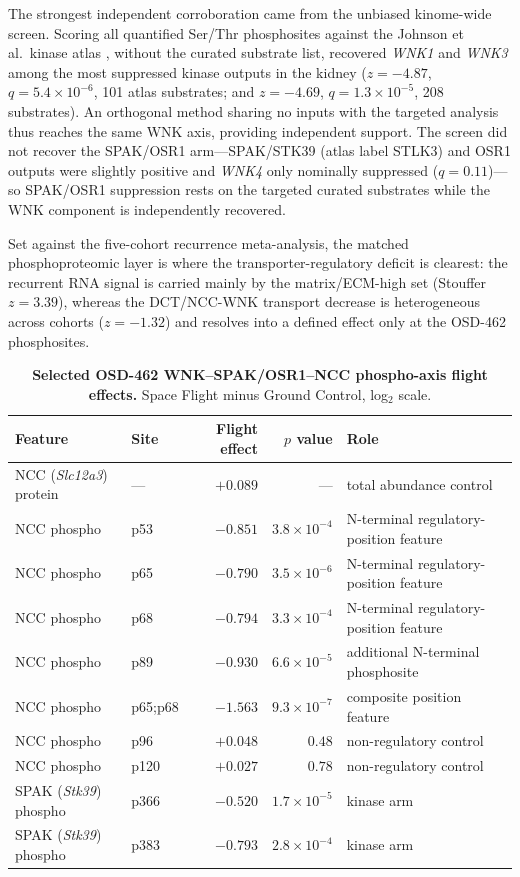 \documentclass[11pt]{article}
\newcommand{\gene}[1]{\textit{#1}}
\begin{document}
The strongest independent corroboration came from the unbiased kinome-wide screen. Scoring all quantified Ser/Thr phosphosites against the Johnson et al.\ kinase atlas \citep{johnson2023atlas}, without the curated substrate list, recovered \gene{WNK1} and \gene{WNK3} among the most suppressed kinase outputs in the kidney ($z=-4.87$, $q=5.4\times10^{-6}$, 101 atlas substrates; and $z=-4.69$, $q=1.3\times10^{-5}$, 208 substrates). An orthogonal method sharing no inputs with the targeted analysis thus reaches the same WNK axis, providing independent support. The screen did not recover the SPAK/OSR1 arm---SPAK/STK39 (atlas label STLK3) and OSR1 outputs were slightly positive and \gene{WNK4} only nominally suppressed ($q=0.11$)---so SPAK/OSR1 suppression rests on the targeted curated substrates while the WNK component is independently recovered.

Set against the five-cohort recurrence meta-analysis, the matched phosphoproteomic layer is where the transporter-regulatory deficit is clearest: the recurrent RNA signal is carried mainly by the matrix/ECM-high set (Stouffer $z=3.39$), whereas the DCT/NCC-WNK transport decrease is heterogeneous across cohorts ($z=-1.32$) and resolves into a defined effect only at the OSD-462 phosphosites.

\begin{table}[H]
\centering\small
\caption{\textbf{Selected OSD-462 WNK--SPAK/OSR1--NCC phospho-axis flight effects.} Space Flight minus Ground Control, log$_2$ scale.}
\label{tab:phospho}
\begin{tabular}{llrrl}
\toprule
Feature & Site & Flight effect & $p$ value & Role \\
\midrule
NCC (\gene{Slc12a3}) protein & --- & $+0.089$ & --- & total abundance control \\
NCC phospho & p53 & $-0.851$ & $3.8\times10^{-4}$ & N-terminal regulatory-position feature \\
NCC phospho & p65 & $-0.790$ & $3.5\times10^{-6}$ & N-terminal regulatory-position feature \\
NCC phospho & p68 & $-0.794$ & $3.3\times10^{-4}$ & N-terminal regulatory-position feature \\
NCC phospho & p89 & $-0.930$ & $6.6\times10^{-5}$ & additional N-terminal phosphosite \\
NCC phospho & p65;p68 & $-1.563$ & $9.3\times10^{-7}$ & composite position feature \\
NCC phospho & p96 & $+0.048$ & $0.48$ & non-regulatory control \\
NCC phospho & p120 & $+0.027$ & $0.78$ & non-regulatory control \\
SPAK (\gene{Stk39}) phospho & p366 & $-0.520$ & $1.7\times10^{-5}$ & kinase arm \\
SPAK (\gene{Stk39}) phospho & p383 & $-0.793$ & $2.8\times10^{-4}$ & kinase arm \\
\bottomrule
\end{tabular}
\end{table}
\end{document}
